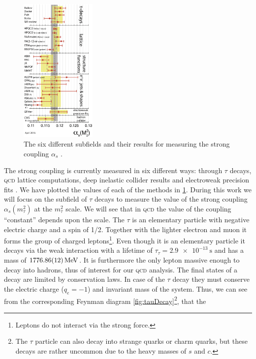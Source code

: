 \documentclass[../../index.tex]{subfiles}
\begin{document}
\begin{figure}
  \centering \vspace{-0.75cm}
  \includegraphics[width=0.33\textwidth]{./images/alphasDetermination.eps}
  \captionsetup{format=plain}
  \caption{The six different subfields and their results for measuring the
    strong coupling \(\alpha_s\) \cite{PDG2018}.}
  \label{fig:alphaSDetermination}
\end{figure}
The strong coupling is currently measured in six different ways: through
\(\tau\) decays, \textsc{qcd} lattice computations, deep inelastic collider
results and electroweak precision fits \cite{PDG2018}. We have plotted the
values of each of the methods in \cref{fig:alphaSDetermination}. During this
work we will focus on the subfield of \(\tau\) decays to measure the value of
the strong coupling \(\alpha_s(m_\tau^2)\) at the \(m_\tau^2\) scale. We will
see that in \textsc{qcd} the value of the coupling ``constant'' depends upon the
scale. The \(\tau\) is an elementary particle with negative electric charge and
a spin of 1/2. Together with the lighter electron and muon it forms the group of
charged leptons\footnote{Leptons do not interact via the strong force.}. Even
though it is an elementary particle it decays via the weak interaction with a
lifetime of \(\tau_\tau=\SI{2.9e-13}{\second}\) and has a mass of
\(\SI{1776.86\pm0.12}{\mega\electronvolt}\)\cite{PDG2018}. It is furthermore the
only lepton massive enough to decay into hadrons, thus of interest for our
\textsc{qcd} analysis. The final states of a decay are limited by conservation
laws. In case of the \(\tau\) decay they must conserve the electric charge
(\(q_e=-1\)) and invariant mass of the system. Thus, we can see from the
corresponding Feynman diagram \cref{fig:tauDecay}\footnote{The \(\tau\) particle
  can also decay into strange quarks or charm quarks, but these decays are
  rather uncommon due to the heavy masses of \(s\) and \(c\).}, that the
\end{document}
